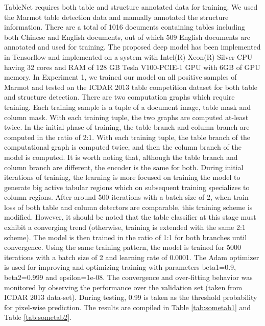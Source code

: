 \documentclass[conference]{IEEEtran}
\begin{document}
TableNet requires both table and structure annotated data for training. We used the Marmot table detection data and manually annotated the structure information. There are a total of 1016 documents containing tables  including both Chinese and English documents, out of which 509 English documents are annotated and used for training. The proposed deep model has been implemented in Tensorflow and implemented on a system with  Intel(R) Xeon(R) Silver CPU having 32 cores and RAM of 128 GB Tesla V100-PCIE-1 GPU with 6GB of GPU memory. In Experiment 1, we trained our model on all positive samples of Marmot and tested on the ICDAR 2013 table competition dataset for both table and structure detection. There are two computation graphs which require training. Each training sample is a tuple of a document image, table mask and column mask. With each training tuple, the two graphs are computed at-least twice. In the initial phase of training, the table branch and column branch are computed in the ratio of 2:1. With each training tuple, the table branch of the computational graph is computed twice, and then the column branch of the model is computed. It is worth noting that, although the table branch and column branch are different, the encoder is the same for both. During initial iterations of training, the learning is more focused on training the model to generate big active tabular regions which on subsequent training specializes to column regions. After around 500 iterations with a batch size of 2, when train loss of both table and column detectors are comparable, this training scheme is modified. However, it should be noted that the table classifier at this stage must exhibit a converging trend (otherwise, training is extended with the same 2:1 scheme). The model is then trained in the ratio of 1:1 for both branches until convergence. Using the same training pattern, the model is trained for 5000 iterations with a batch size of 2 and learning rate of 0.0001. The Adam optimizer is used for improving and optimizing training with parameters beta1=0.9, beta2=0.999 and epsilon=1e-08. The convergence and over-fitting behavior was monitored by observing the performance over the validation set (taken from ICDAR 2013 data-set). During testing, 0.99 is taken as the threshold probability for pixel-wise prediction. The results are compiled in Table \ref{tab:sometab1} and Table \ref{tab:sometab2}. 
\end{document}
